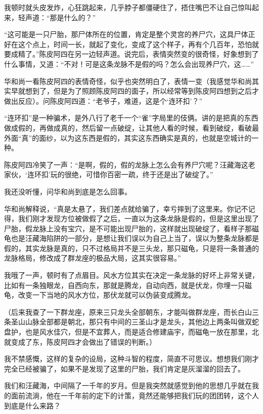 我顿时就头皮发炸，心狂跳起来，几乎脖子都僵硬住了，捂住嘴巴不让自己惊叫起来，轻声道：“那是什么的？”

“这可能是一只尸胎，那尸体所在的位置，肯定是整个灵宫的养尸穴，这具尸体正好在这个点上，时间一长，就起了变化，变成了这个样子，再有个几百年，恐怕就要成精了。”陈皮阿四在另一边轻声道。说完后，表情突然变的很奇怪，好象想到了什么事情，又道：“不对！可是这条龙脉不是假的吗？怎么会出现养尸穴，这……”

华和尚一看陈皮阿四的表情奇怪，似乎也突然明白了，表情一变（我感觉华和尚其实早就想到了，但是为了照顾陈皮阿四的面子，所以经常等到陈皮阿四想到之后才做出反应）。问陈皮阿四道：“老爷子，难道，这是个‘连环扣’？”

“连环扣”是一种骗术，是外八行了老千一个“雀”字局里的伎俩。讲的是把真的东西做成假的，再做成真的，然后留一点破绽，让其他人看的时候，看到破绽，看破最外面“真”的面纱，以为这东西是假的，其实这东西确实是真的，也就是空城计的一种。

陈皮阿四冷笑了一声：“是啊，假的，假的龙脉上怎么会有养尸穴呢？汪藏海这老家伙，‘连环扣’玩的很绝，可惜你百密一疏，终于还是出了破绽了。”

我还没听懂，问华和尚到底是怎么回事。

华和尚解释说，“真是太悬了，我们差点就给骗了，幸亏摔到了这里来。你记不记得，我们刚才发现方位被做假了之后，一直以为这条龙脉是假的，但是这里出现了尸胎，假龙脉上没有宝穴，是不可能出现尸胎的，这样就出现破绽了，看样子那磁龟也是汪藏海陷阱的一部分，是想让我们误以为自己上当了，误以为整条龙脉都是假的，其实龙脉是真的，只不过格局并不是三头龙，那只磁龟，只是将一条普通的龙脉格局，修改成了群龙座的极品大局，这其实很容易。”

我哦了一声，顿时有了点眉目。风水方位其实在决定一条龙脉的好坏上非常关键，比如有一条独眼龙，自西向东，那就是腾龙，自动向西，就是伏龙，你埋一只磁龟，改变一下当地的风水方位，那伏龙就可以伪装变成腾龙。

（后来我查了一下群龙座，原来三只龙头全部朝东，才能叫做群龙座，而长白山三条圣山山脉全部都是朝北，那只有中间的三圣山才是龙头，其他边上两条叫做双蛇盘护，也是风水佳穴，但是不宜葬人，而是适合修建庙宇，而磁龟一放在那里，北就变成了东，陈皮阿四才会做出了错误的判断。）

我不禁感慨，这样的复杂的设局，这种斗智的程度，简直不可思议。想想我们刚才完全已经被骗了，如果不是发现了这里的尸胎，我们肯定是灰溜溜的回去了。

我们和汪藏海，中间隔了一千年的岁月。但是我突然就感觉到他的思想几乎就在我的面前流淌，他在一千年前的定下的计策，竟然还能够把我们玩的团团转，这个人到底是什么来路？

